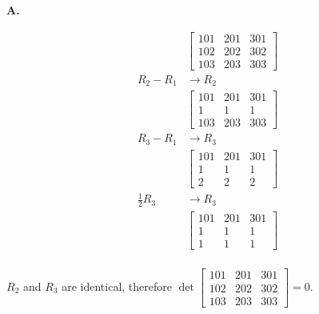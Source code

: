\documentclass[main.tex]{subfiles}
\begin{document}
\begin{enumerate}
    \textbf{A.}
    
    $$
    \begin{aligned}
    &\left[\begin{array}{lll}
    101 & 201 & 301 \\
    102 & 202 & 302 \\
    103 & 203 & 303
    \end{array}\right]\\
    R_2 - R_1 &\rightarrow R_2\\
    &\left[\begin{array}{ccc}
    101 & 201 & 301 \\
    1 & 1 & 1 \\
    103 & 203 & 303
    \end{array}\right]\\
    R_3 - R_1 &\rightarrow R_3\\
    &\left[\begin{array}{ccc}
    101 & 201 & 301 \\
    1 & 1 & 1 \\
    2 & 2 & 2
    \end{array}\right]\\
    \frac{1}{2}R_3 &\rightarrow R_3\\
    &\left[\begin{array}{ccc}
    101 & 201 & 301 \\
    1 & 1 & 1 \\
    1 & 1 & 1
    \end{array}\right]\\
    \end{aligned}
    $$
    
    $R_2$ and $R_3$ are identical, therefore $\operatorname{det}\left[\begin{array}{lll}
    101 & 201 & 301 \\
    102 & 202 & 302 \\
    103 & 203 & 303
    \end{array}\right] = 0$.
    

\end{enumerate}
\end{document}
